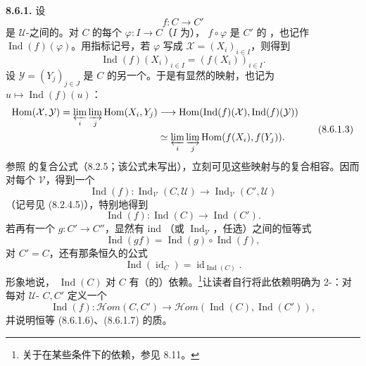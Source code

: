 \textbf{8.6.1.} 设
\[
f:C\longrightarrow C'\tag{8.6.1.1}
\]
是 $\mathcal U$-之间的。对 $C$ 的每个  $\varphi:I\to C$（$I$ 为）， $f\circ\varphi$ 是 $C'$ 的 ，也记作 $\operatorname{Ind}(f)(\varphi)$。用指标记号，若 $\varphi$ 写成 $\mathcal X=(X_i)_{i\in I}$，则得到
\[
\operatorname{Ind}(f)(X_i)_{i\in I}=(f(X_i))_{i\in I}.\tag{8.6.1.2}
\]
设 $\mathcal Y=(Y_j)_{j\in J}$ 是 $C$ 的另一个。于是有显然的映射，也记为 $u\mapsto\operatorname{Ind}(f)(u)$：
\[
\begin{aligned}
\operatorname{Hom}(\mathcal X,\mathcal Y)
=\varprojlim_i\varinjlim_j\operatorname{Hom}(X_i,Y_j)&\longrightarrow
\operatorname{Hom}(\operatorname{Ind}(f)(\mathcal X),\operatorname{Ind}(f)(\mathcal Y))\\
&\simeq\varprojlim_i\varinjlim_j\operatorname{Hom}(f(X_i),f(Y_j)).
\end{aligned}\tag{8.6.1.3}
\]
参照 的复合公式（8.2.5；该公式未写出），立刻可见这些映射与的复合相容。因而对每个 $\mathcal V$，得到一个
\[
\operatorname{Ind}(f):\operatorname{Ind}_{\mathcal V}(C,\mathcal U)
\longrightarrow\operatorname{Ind}_{\mathcal V}(C',\mathcal U)\tag{8.6.1.4}
\]
（记号见 (8.2.4.5)），特别地得到
\[
\operatorname{Ind}(f):\operatorname{Ind}(C)\longrightarrow\operatorname{Ind}(C').\tag{8.6.1.5}
\]
若再有一个 $g:C'\to C''$，显然有 ind （或 $\operatorname{Ind}_{\mathcal V}$，任选）之间的恒等式
\[
\operatorname{Ind}(gf)=\operatorname{Ind}(g)\circ\operatorname{Ind}(f),\tag{8.6.1.6}
\]
对 $C'=C$，还有那条恒久的公式
\[
\operatorname{Ind}(\operatorname{id}_C)=\operatorname{id}_{\operatorname{Ind}(C)}.\tag{8.6.1.7}
\]
形象地说， $\operatorname{Ind}(C)$ 对 $C$ 有（的）依赖。\footnote[3]{关于在某些条件下的依赖，参见 8.11。}让读者自行将此依赖明确为 2-：对每对 $\mathcal U$- $C,C'$ 定义一个
\[
\operatorname{Ind}(f):\mathscr{H}\!om(C,C')\longrightarrow
\mathscr{H}\!om(\operatorname{Ind}(C),\operatorname{Ind}(C')),\tag{8.6.1.8}
\]
并说明恒等 (8.6.1.6)、(8.6.1.7) 的质。

